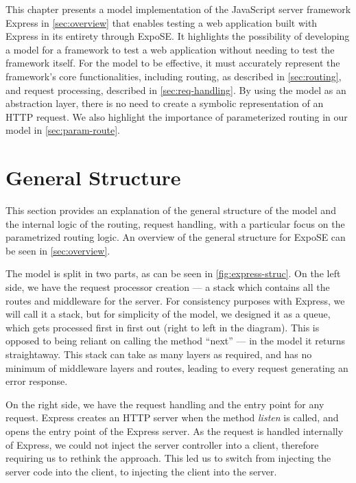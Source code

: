 This chapter presents a model implementation of the JavaScript server framework Express in \autoref{sec:overview} that enables testing a web application built with Express in its entirety through ExpoSE. It highlights the possibility of developing a model for a framework to test a web application without needing to test the framework itself. For the model to be effective, it must accurately represent the framework's core functionalities, including routing, as described in \autoref{sec:routing}, and request processing, described in \autoref{sec:req-handling}. By using the model as an abstraction layer, there is no need to create a symbolic representation of an HTTP request. We also highlight the importance of parameterized routing in our model in \autoref{sec:param-route}.

\section{General Structure}

This section provides an explanation of the general structure of the model and the internal logic of the routing, request handling, with a particular focus on the parametrized routing logic. An overview of the general structure for ExpoSE can be seen in \autoref{sec:overview}.

The model is split in two parts, as can be seen in \autoref{fig:express-struc}. On the left side, we have the request processor creation — a stack which contains all the routes and middleware for the server. For consistency purposes with Express, we will call it a stack, but for simplicity of the model, we designed it as a queue, which gets processed first in first out (right to left in the diagram). This is opposed to being reliant on calling the method “next” — in the model it returns straightaway. 
This stack can take as many layers as required, and has no minimum of middleware layers and routes, leading to every request generating an error response. 



On the right side, we have the request handling and the entry point for any request. 
Express creates an HTTP server when the method \textit{listen} is called, and opens the entry point of the Express server. As the request is handled internally of Express, we could not inject the server controller into a client, therefore requiring us to rethink the approach. This led us to switch from injecting the server code into the client, to injecting the client into the server. 


